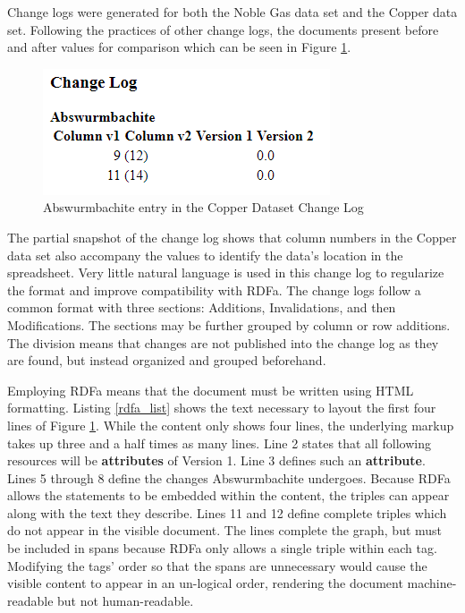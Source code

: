 Change logs were generated for both the Noble Gas data set and the Copper data set.
Following the practices of other change logs, the documents present before and after values for comparison which can be seen in Figure \ref{changelog_zoomed}.
\begin{figure}
	\centering
	\includegraphics[scale=0.80]{figures/Changelog-zoomed.png}
	\caption{Abswurmbachite entry in the Copper Dataset Change Log}
	\label{changelog_zoomed}
\end{figure}
The partial snapshot of the change log shows that column numbers in the Copper data set also accompany the values to identify the data's location in the spreadsheet.
Very little natural language is used in this change log to regularize the format and improve compatibility with RDFa.
The change logs follow a common format with three sections: Additions, Invalidations, and then Modifications.
The sections may be further grouped by column or row additions.
The division means that changes are not published into the change log as they are found, but instead organized and grouped beforehand.

Employing RDFa means that the document must be written using HTML formatting.
Listing \ref{rdfa_list} shows the text necessary to layout the first four lines of Figure \ref{changelog_zoomed}.
While the content only shows four lines, the underlying markup takes up three and a half times as many lines.
Line 2 states that all following resources will be \textbf{attributes} of Version 1.
Line 3 defines such an \textbf{attribute}.
Lines 5 through 8 define the changes Abswurmbachite undergoes.
Because RDFa allows the statements to be embedded within the content, the triples can appear along with the text they describe.
Lines 11 and 12 define complete triples which do not appear in the visible document.
The lines complete the graph, but must be included in spans because RDFa only allows a single triple within each tag.
Modifying the tags' order so that the spans are unnecessary would cause the visible content to appear in an un-logical order, rendering the document machine-readable but not human-readable.

